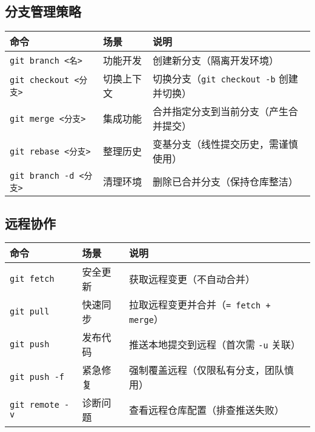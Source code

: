 \subsection{分支管理策略}
\begin{center}
\begin{tabular}{llp{8cm}}
    \toprule
    \textbf{命令} & \textbf{场景} & \textbf{说明} \\
    \midrule
    \texttt{git branch <名>} & 功能开发 & 创建新分支（隔离开发环境） \\
    \texttt{git checkout <分支>} & 切换上下文  & 切换分支（\texttt{git checkout -b} 创建并切换） \\
    \texttt{git merge <分支>} & 集成功能 & 合并指定分支到当前分支（产生合并提交） \\
    \texttt{git rebase <分支>} & 整理历史 & 变基分支（线性提交历史，需谨慎使用） \\
    \texttt{git branch -d <分支>} & 清理环境 & 删除已合并分支（保持仓库整洁） \\
    \bottomrule
\end{tabular}
\end{center}

\subsection{远程协作}
\begin{center}
\begin{tabular}{llp{8cm}}
    \toprule
    \textbf{命令} & \textbf{场景} & \textbf{说明} \\
    \midrule
    \texttt{git fetch} & 安全更新 & 获取远程变更（不自动合并） \\
    \texttt{git pull} & 快速同步 & 拉取远程变更并合并（\texttt{= fetch + merge}） \\
    \texttt{git push} & 发布代码 & 推送本地提交到远程（首次需 \texttt{-u} 关联） \\
    \texttt{git push -f} & 紧急修复 & 强制覆盖远程（仅限私有分支，团队慎用） \\
    \texttt{git remote -v} & 诊断问题 & 查看远程仓库配置（排查推送失败） \\
    \bottomrule
\end{tabular}
\end{center}

